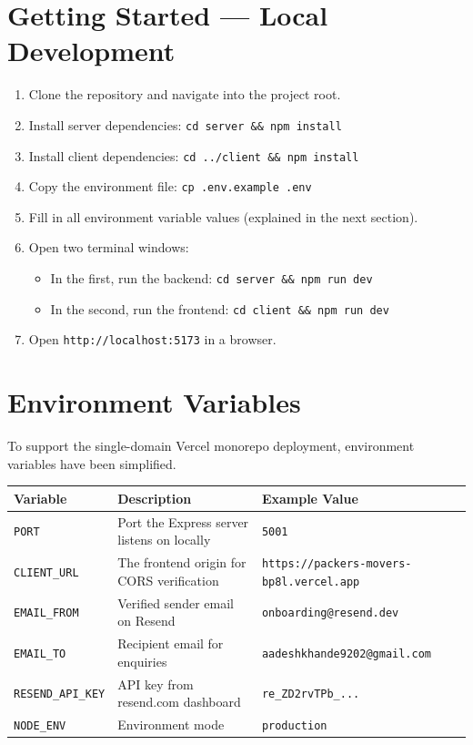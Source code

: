 \documentclass[11pt,a4paper]{article}
\begin{document}
\section{Getting Started — Local Development}
\begin{enumerate}
    \item Clone the repository and navigate into the project root.
    \item Install server dependencies: \texttt{cd server \&\& npm install}
    \item Install client dependencies: \texttt{cd ../client \&\& npm install}
    \item Copy the environment file: \texttt{cp .env.example .env}
    \item Fill in all environment variable values (explained in the next section).
    \item Open two terminal windows:
    \begin{itemize}
        \item In the first, run the backend: \texttt{cd server \&\& npm run dev}
        \item In the second, run the frontend: \texttt{cd client \&\& npm run dev}
    \end{itemize}
    \item Open \texttt{http://localhost:5173} in a browser.
\end{enumerate}

\section{Environment Variables}
To support the single-domain Vercel monorepo deployment, environment variables have been simplified. 

\begin{table}[h!]
\centering
\begin{tabularx}{\textwidth}{l X l}
\toprule
\textbf{Variable} & \textbf{Description} & \textbf{Example Value} \\
\midrule
\texttt{PORT} & Port the Express server listens on locally & \texttt{5001} \\
\texttt{CLIENT\_URL} & The frontend origin for CORS verification & \texttt{https://packers-movers-bp8l.vercel.app} \\
\texttt{EMAIL\_FROM} & Verified sender email on Resend & \texttt{onboarding@resend.dev} \\
\texttt{EMAIL\_TO} & Recipient email for enquiries & \texttt{aadeshkhande9202@gmail.com} \\
\texttt{RESEND\_API\_KEY} & API key from resend.com dashboard & \texttt{re\_ZD2rvTPb\_...} \\
\texttt{NODE\_ENV} & Environment mode & \texttt{production} \\
\bottomrule
\end{tabularx}
\end{table}
\end{document}
